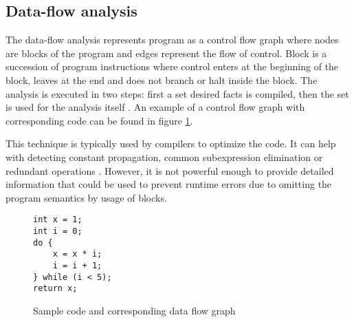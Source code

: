 \documentclass[12pt,final,oneside]{fithesis2}
\theoremstyle{definition}
\begin{document}
\subsection{Data-flow analysis}

The data-flow analysis represents program as a control flow graph where
nodes are blocks of the program and edges represent the flow of
control. Block is a succession of program instructions where control
enters at the beginning of the block, leaves at the end and does not
branch or halt inside the block. The analysis is executed in two steps:
first a set desired facts is compiled, then the set is used for the
analysis itself \cite{Wogerer05-1}. An example of a control flow graph
with corresponding code can be found in figure \ref{fig:dfg}.

This technique is typically used by compilers to optimize the code. It
can help with detecting constant propagation, common subexpression
elimination or redundant operations \cite{Kildall73-1}. However, it is
not powerful enough to provide detailed information that could be used
to prevent runtime errors due to omitting the program semantics by usage
of blocks.

\begin{figure}[ht]
\begin{minipage}{0.3\textwidth}
\begin{lstlisting}
int x = 1;
int i = 0;
do {
    x = x * i;
    i = i + 1;
} while (i < 5);
return x;
\end{lstlisting}
\end{minipage}
\begin{minipage}{0.7\textwidth}
\centering
{}
\end{minipage}
\caption{Sample code and corresponding data flow graph}
\label{fig:dfg}
\end{figure}
\end{document}
